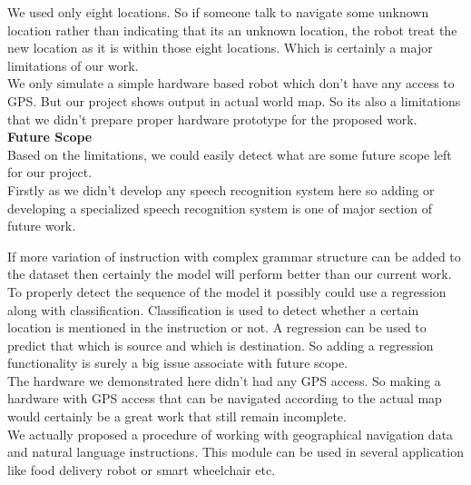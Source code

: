We used only eight locations. So if someone talk to navigate some unknown location rather than indicating that its an unknown location, the robot treat the new location as it is within those eight locations. Which is certainly a major limitations of our work. \\

We only simulate a simple hardware based robot which don't have any access to GPS. But our project shows output in actual world map. So its also a limitations that we didn't prepare proper hardware prototype for the proposed work. \\

\textbf{Future Scope} \\
Based on the limitations, we could easily detect what are some future scope left for our project. \\

Firstly as we didn't develop any speech recognition system here so adding or developing a specialized speech recognition system is one of major section of future work.

If more variation of instruction with complex grammar structure can be added to the dataset then certainly the model will perform better than our current work. \\

To properly detect the sequence of the model it possibly could use a regression along with classification. Classification is used to detect whether a certain location is mentioned in the instruction or not. A regression can be used to predict that which is source and which is destination. So adding a regression functionality is surely a big issue associate with future scope. \\

The hardware we demonstrated here didn't had any GPS access. So making a hardware with GPS access that can be navigated according to the actual map would certainly be a great work that still remain incomplete. \\

We actually proposed a procedure of working with geographical navigation data and natural language instructions. This module can be used in several application like food delivery robot or smart wheelchair etc. 
	
